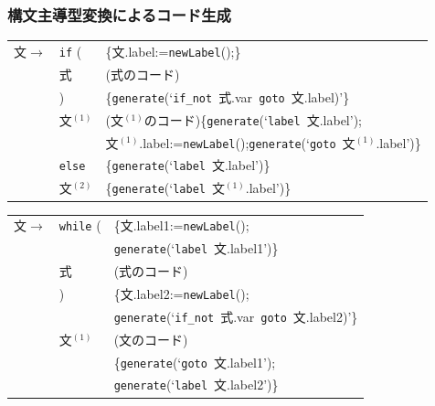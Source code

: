 \documentclass[dvipdfmx,cjk]{beamer}
\newcommand{\makenewlabel}{{\tt newLabel}()}
\newcommand{\genlabel}[1]{{\tt generate}(`{\tt label}\ {#1}')}
\newcommand{\genifnot}[2]{{\tt generate}(`{\tt if\_not}\ {#1}\ {\tt goto}\ {#2})'}
\newcommand{\gengoto}[1]{{\tt generate}(`{\tt goto}\ {#1}')}
\begin{document}
\begin{frame}
 \frametitle{構文主導型変換によるコード生成}
 {\small
 \begin{tabular}{lll}
  文$\rightarrow$ & {\tt if} ( & \{文.label:=\makenewlabel;\}\\
  & 式 & (式のコード)\\
  & )  & \{\genifnot{式.var}{文.label}\}\\
  & 文$^{(1)}$ & (文$^{(1)}$のコード)\{\genlabel{文.label};\\
  & & 文$^{(1)}$.label:=\makenewlabel;\gengoto{文$^{(1)}$.label}\}\\
  & {\tt else} & \{\genlabel{文.label}\}\\  
  & 文{$^{(2)}$} & \{\genlabel{文$^{(1)}$.label}\}
 \end{tabular}

\vspace*{1zw}

 \begin{tabular}{lll}
  文$\rightarrow$ & {\tt while} ( & \{文.label1:=\makenewlabel;\\
  & & \genlabel{文.label1}\} \\
  & 式 & (式のコード)\\
  & )  & \{文.label2:=\makenewlabel;\\
  &    & \genifnot{式.var}{文.label2}\}\\
  & 文$^{(1)}$ & (文のコード)\\
  &    & \{\gengoto{文.label1};\\
  &    & \genlabel{文.label2}\}\\
 \end{tabular}
 }
\end{frame}



\end{document}
